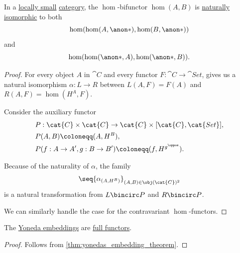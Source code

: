 \begin{theorem}\label{thm:yonedas_embedding_theorem}
  In a \hyperref[def:small_category]{locally small} \hyperref[def:category]{category}, the \( \hom \)-bifunctor \( \hom(A, B) \) is \hyperref[def:natural_isomorphism]{naturally isomorphic} to both
  \begin{equation*}
    \hom(\hom(A, \anon*), \hom(B, \anon*))
  \end{equation*}
  and
  \begin{equation*}
    \hom(\hom(\anon*, A), \hom(\anon*, B)).
  \end{equation*}
\end{theorem}
\begin{proof}
  For every object \( A \) in \( \cat{C} \) and every functor \( F: \cat{C} \to \cat{Set} \),  gives us a natural isomorphism \( \alpha: L \to R \) between \( L(A, F) = F(A) \) and \( {R(A, F) = \hom(H^A, F)} \).

  Consider the auxiliary functor
  \begin{equation*}
    \begin{aligned}
      &P: \cat{C} \times \cat{C} \to \cat{C} \times [\cat{C}, \cat{Set}], \\
      &P(A, B) \coloneqq (A, H^B), \\
      &P(f: A \to A', g: B \to B') \coloneqq (f, H^{g^\oppos}). \\
    \end{aligned}
  \end{equation*}

  Because of the naturality of \( \alpha \), the family
  \begin{equation*}
    \seq{ \alpha_{(A, H^B)} }_{(A, B) \in \obj(\cat{C})^2}
  \end{equation*}
  is a natural transformation from \( L \bincirc P \) and \( R \bincirc P \).

  We can similarly handle the case for the contravariant \( \hom \)-functors.
\end{proof}

\begin{corollary}\label{thm:yoneda_embeddings_are_full}
  The \hyperref[def:yoneda_embeddings]{Yoneda embeddings} are \hyperref[def:functor_invertibility/full]{full functors}.
\end{corollary}
\begin{proof}
  Follows from \cref{thm:yonedas_embedding_theorem}.
\end{proof}

